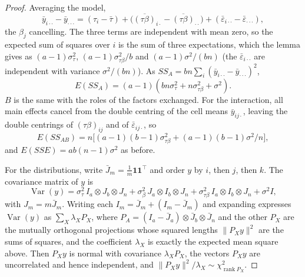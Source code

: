 \documentclass[11pt,a4paper]{article}
\numberwithin{equation}{section}
\DeclareMathOperator{\Var}{Var}
\theoremstyle{definition}
\begin{document}
\begin{proof}
Averaging the model,
\[
\bar y_{i\cdot\cdot} - \bar y_{\cdot\cdot\cdot} = (\tau_i - \bar\tau) + \bigl(\overline{(\tau\beta)}_{i\cdot} - \overline{(\tau\beta)}_{\cdot\cdot}\bigr) + (\bar\varepsilon_{i\cdot\cdot} - \bar\varepsilon_{\cdot\cdot\cdot}) ,
\]
the $\beta_j$ cancelling. The three terms are independent with mean zero, so the expected sum of squares over $i$ is the sum of three expectations, which the
lemma gives as $(a - 1)\sigma^2_\tau$, $(a - 1)\sigma^2_{\tau\beta}/b$ and $(a - 1)\sigma^2/(bn)$ (the $\bar\varepsilon_{i\cdot\cdot}$ are independent with variance $\sigma^2/(bn)$). As $SS_A = bn\sum_i(\bar y_{i\cdot\cdot} - \bar y_{\cdot\cdot\cdot})^2$,
\[
E(SS_A) = (a - 1)(bn\sigma^2_\tau + n\sigma^2_{\tau\beta} + \sigma^2) .
\]
$B$ is the same with the roles of the factors exchanged. For the interaction, all main effects cancel from the double centring of the cell means
$\bar y_{ij\cdot}$, leaving the double centrings of $(\tau\beta)_{ij}$ and of $\bar\varepsilon_{ij\cdot}$, so
\[
E(SS_{AB}) = n\bigl[(a - 1)(b - 1)\sigma^2_{\tau\beta} + (a - 1)(b - 1)\sigma^2/n\bigr] ,
\]
and $E(SSE) = ab(n - 1)\sigma^2$ as before.

For the distributions, write $\bar J_m = \frac1m\mathbf 1\mathbf 1^\top$ and order $y$ by $i$, then $j$, then $k$. The covariance matrix of $y$ is
\[
\Var(y) = \sigma^2_\tau\,I_a \otimes J_b \otimes J_n + \sigma^2_\beta\,J_a \otimes I_b \otimes J_n + \sigma^2_{\tau\beta}\,I_a \otimes I_b \otimes J_n + \sigma^2 I ,
\]
with $J_m = m\bar J_m$. Writing each $I_m = \bar J_m + (I_m - \bar J_m)$ and expanding expresses $\Var(y)$ as $\sum_X\lambda_XP_X$, where $P_A = (I_a - \bar J_a) \otimes \bar J_b \otimes \bar J_n$ and the
other $P_X$ are the mutually orthogonal projections whose squared lengths $\|P_Xy\|^2$ are the sums of squares, and the coefficient $\lambda_X$ is exactly the
expected mean square above. Then $P_Xy$ is normal with covariance $\lambda_XP_X$, the vectors $P_Xy$ are uncorrelated and hence independent, and
$\|P_Xy\|^2/\lambda_X \sim \chi^2_{\operatorname{rank}P_X}$.
\end{proof}
\end{document}
